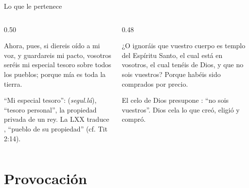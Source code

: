 \begin{frame}{Lo que le pertenece}
\begin{columns}[t,onlytextwidth]
\begin{column}{0.50\textwidth}
\begin{cita}Ahora, pues, si diereis oído a mi voz, y guardareis mi pacto, vosotros seréis mi especial tesoro sobre todos los pueblos; porque mía es toda la tierra.\end{cita}
\scriptsize ``Mi especial tesoro'':  (\emph{segul.lá}), ``tesoro personal'', la propiedad privada de un rey. La LXX traduce , ``pueblo de su propiedad'' (cf. Tit 2:14).
\end{column}
\begin{column}{0.48\textwidth}
\begin{cita}¿O ignoráis que vuestro cuerpo es templo del Espíritu Santo, el cual está en vosotros, el cual tenéis de Dios, y que no sois vuestros? Porque habéis sido comprados por precio.\end{cita}
\small El celo de Dios presupone : ``no sois vuestros''. Dios cela lo que creó, eligió y compró.
\end{column}
\end{columns}\par\smallskip
{}
\end{frame}

\section{Provocación}

